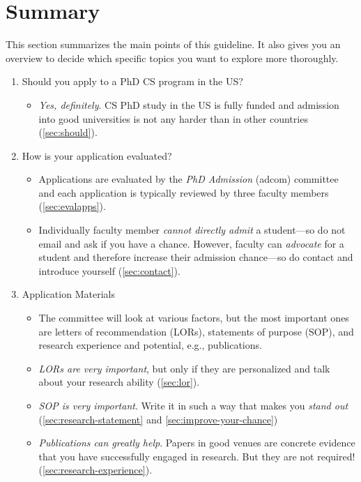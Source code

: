 \documentclass[oneside,11pt,dvipsnames]{book}
\begin{document}
\newpage
\tableofcontents

\chapter{Summary}\label{sec:summary}

This section summarizes the main points of this guideline. It also gives you an overview to decide which specific topics you want to explore more thoroughly.


\begin{enumerate}
  \item Should you apply to a PhD CS program in the US?
        \begin{itemize}
          \item \emph{Yes, definitely}.  CS PhD study in the US is fully funded and admission into good universities is not any harder than in other countries (\autoref{sec:should}).
        \end{itemize}
  \item How is your application evaluated?
        \begin{itemize}
          \item Applications are evaluated by the \emph{PhD Admission} (adcom) committee and each application is typically reviewed by three faculty members (\autoref{sec:evalapps}).
          \item Individually faculty member \emph{cannot directly admit} a student---so do not email and ask if you have a chance. However, faculty can \emph{advocate} for a student and therefore increase their admission chance---so do contact and introduce yourself (\autoref{sec:contact}).
         \end{itemize}
  \item Application Materials
        \begin{itemize}
          \item The committee will look at various factors, but the most important ones are letters of recommendation (LORs),  statements of purpose (SOP), and research experience and potential, e.g., publications.
          \item \emph{LORs are very important}, but only if they are personalized and talk about your research ability (\autoref{sec:lor}).
          \item \emph{SOP is very important}. Write it in such a way that makes you \emph{stand out} (\autoref{sec:research-statement} and \autoref{sec:improve-your-chance})
          \item  \emph{Publications can greatly help}. Papers in good venues are concrete evidence that you have successfully engaged in research. But they are not required! (\autoref{sec:research-experience}).


\end{itemize}
\end{enumerate}
\end{document}

